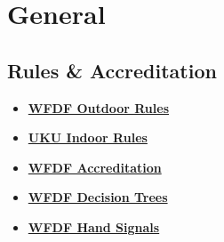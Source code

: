 \section{General}
\subsection*{Rules \& Accreditation}
\begin{itemize}
    \item \textcolor{blue}{\textbf{\href{https://rules.wfdf.org/resources}{WFDF Outdoor Rules}}}
    \item \textcolor{blue}{\textbf{\href{https://www.ukultimate.com/system/files/UKU\%20Rules\%20of\%20Indoor\%20Ultimate\%202017.pdf}{UKU Indoor Rules}}}
    \item \textcolor{blue}{\textbf{\href{https://rules.wfdf.org/accreditation}{WFDF Accreditation}}}
    \item \textcolor{blue}{\textbf{\href{https://rules.wfdf.org/documents/wfdf-rules-of-ultimate-2021-2024-decision-diagrams}{WFDF Decision Trees}}}
    \item \textcolor{blue}{\textbf{\href{https://rules.wfdf.org/documents/wfdf-rules-of-ultimate-2021-2024-hand-signals}{WFDF Hand Signals}}}
\end{itemize}

